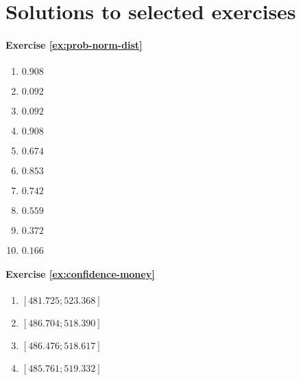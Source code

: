 \section{Solutions to selected exercises}
\label{sec:oplossingen-steekproefonderzoek}

\paragraph{Exercise \ref{ex:prob-norm-dist}}

\begin{enumerate}[label=\alph*.]
  \item $0.908$
  \item $0.092$
  \item $0.092$
  \item $0.908$
  \item $0.674$
  \item $0.853$
  \item $0.742$
  \item $0.559$
  \item $0.372$
  \item $0.166$
\end{enumerate}

\paragraph{Exercise \ref{ex:confidence-money}}

\begin{enumerate}
  \item $[481.725; 523.368]$
  \item $[486.704; 518.390]$
  \item $[486.476; 518.617]$
  \item $[485.761; 519.332]$
\end{enumerate}

   